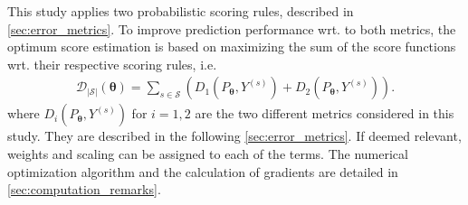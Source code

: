 This study applies two probabilistic scoring rules, described in \cref{sec:error_metrics}. To improve prediction performance wrt. to both metrics, the optimum score estimation is based on maximizing the sum of the score functions wrt. their respective scoring rules, i.e.
\begin{align}
     \mathcal{D}_{{|\mathcal{S}|}}(\bm{\theta}) = \sum_{s \in \mathcal{S}} \left( D_1\left(P_{\bm{\theta}}, Y^{(s)}\right) + D_2\left(P_{\bm{\theta}}, Y^{(s)}\right) \right). \label{eq:mean_score_combination}
\end{align}
where $D_i(P_{\bm{\theta}}, Y^{(s)})$ for $i = 1,2$ are the two different metrics considered in this study. They are described in the following \cref{sec:error_metrics}. If deemed relevant, weights and scaling can be assigned to each of the terms. 
The numerical optimization algorithm and the calculation of gradients are detailed in \cref{sec:computation_remarks}.














